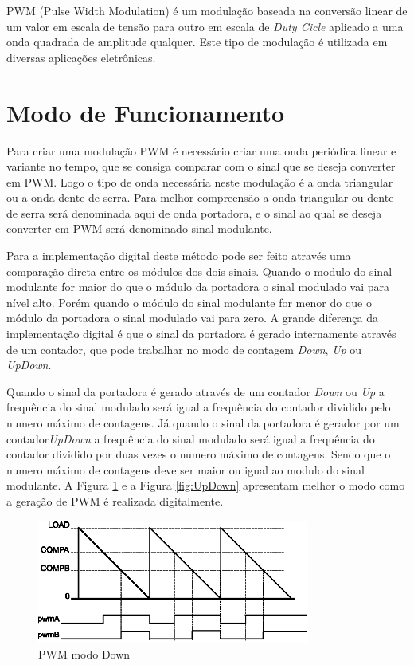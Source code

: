 
PWM (Pulse Width Modulation) é um modulação baseada na conversão linear de um valor em escala de tensão para outro em escala de \emph{Duty Cicle} aplicado a uma onda quadrada de amplitude qualquer. Este tipo de modulação é utilizada em diversas aplicações eletrônicas. 

\section{Modo de Funcionamento}

Para criar uma modulação PWM é necessário criar uma onda periódica linear e variante no tempo, que se consiga comparar com o sinal que se deseja converter em PWM. Logo o tipo de onda necessária neste modulação é a onda triangular ou a onda dente de serra. Para melhor compreensão a onda triangular ou dente de serra será denominada aqui de onda portadora, e o sinal ao qual se deseja converter em PWM será denominado sinal modulante.
  
Para a implementação digital deste método pode ser feito através uma comparação direta entre os módulos dos dois sinais. Quando o modulo do sinal modulante for maior do que o  módulo da portadora  o sinal modulado vai para nível alto. Porém quando o módulo do sinal modulante for menor do que o módulo da portadora o sinal  modulado vai para zero. A grande diferença da implementação digital é que o sinal da portadora é gerado internamente através de um contador, que pode trabalhar no modo de contagem \emph{Down}, \emph{Up} ou \emph{UpDown}.

Quando o sinal da portadora é gerado através de um contador \emph{Down} ou \emph{Up}  a frequência do sinal modulado será igual a frequência do contador dividido pelo numero máximo de contagens. Já quando o sinal da portadora é gerador por um contador\emph{UpDown} a frequência do sinal modulado será igual a frequência do contador dividido por duas vezes o numero máximo de contagens. Sendo que o numero máximo de contagens deve ser maior ou igual ao modulo do sinal modulante. A Figura \ref{fig:Down} e a Figura \ref{fig:UpDown} apresentam melhor o modo como a geração de PWM é realizada digitalmente.  

\begin{figure}[H]
	\centering
\includegraphics[width=0.8\textwidth] {figuras/Down.eps}
	\caption{PWM modo Down \cite{DATASHEET_TIVA}}
	\label{fig:Down}
\end{figure}

